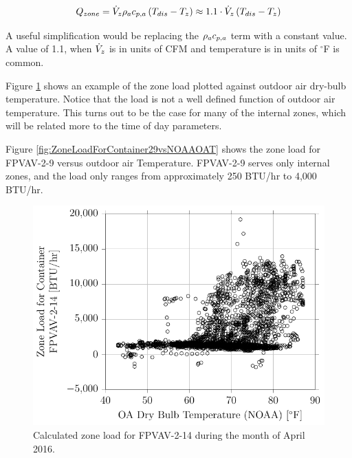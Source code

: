 \begin{equation}
    Q_{zone}=\dot{V}_{z} \rho_a c_{p,a}{} \left(T_{dis}-T_{z} \right) \approx 1.1 \cdot \dot{V}_{z}\left(T_{dis}-T_{z} \right)
\end{equation}

A useful simplification would be replacing the \(\rho_a c_{p,a}{}\) term with a constant value. A value of 1.1, when \(\dot{V}_{z}\) is in units of CFM and temperature is in units of \(^\circ\)F is common. 

Figure \ref{fig:ZoneLoadforContainerFPVAV214vsOADryBulbTemperatureNOAA} shows an example of the zone load plotted against outdoor air dry-bulb temperature. Notice that the load is not a well defined function of outdoor air temperature. This turns out to be the case for many of the internal zones, which will be related more to the time of day parameters. 

Figure \ref{fig:ZoneLoadForContainer29vsNOAAOAT} shows the zone load for FPVAV-2-9 versus outdoor air Temperature. FPVAV-2-9 serves only internal zones, and the load only ranges from approximately 250 BTU/hr to 4,000 BTU/hr. 




\begin{figure}
\centering
\includegraphics{Plots/CalculatedZoneLoadFPVAV-2-14.pdf}
\caption{Calculated zone load for FPVAV-2-14 during the month of April 2016.}
\label{fig:ZoneLoadforContainerFPVAV214vsOADryBulbTemperatureNOAA}
\end{figure}


